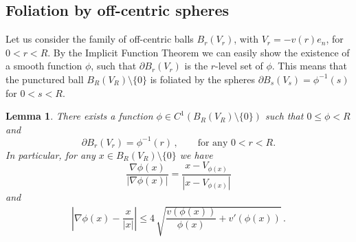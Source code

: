 \documentclass[a4paper,reqno,11pt]{amsart}
\newtheorem{lemma}[theorem]{Lemma}
\newcommand{\de}{\partial}
\renewcommand{\Subset}{\subset\!\subset}
\begin{document}
\subsection{Foliation by off-centric spheres}
Let us consider the family of off-centric balls $B_r(V_r)$, with $V_r = - v(r) e_n$, for $0<r<R$. %
By the Implicit Function Theorem we can easily show the existence of a smooth function $\phi$, such that $\de B_{r}(V_r)$ is the $r$-level set of $\phi$. This means that the punctured ball $B_R(V_R) \setminus \{ 0 \}$ is foliated by the spheres $\de B_{s}(V_s) = \phi^{-1}(s)$ for $0 < s < R$.
\begin{lemma} \label{lem:coarea}
There exists a function $\phi \in C^{1}(B_{R}(V_R) \setminus \{ 0 \})$ such that $0 \leq \phi < R$ and
\begin{equation*}
\de B_{r}(V_r) = \phi^{-1}(r) \, , \qquad \text{for any $0 < r < R$.} 
\end{equation*}
In particular, for any $x \in B_{R}(V_R) \setminus \{ 0 \}$ we have
\begin{equation} \label{eq:gradphi}
\dfrac{\nabla \phi(x)}{|\nabla \phi(x)|} = \dfrac{x - V_{\phi(x)}}{|x - V_{\phi(x)}|}
\end{equation}
and 
\begin{align}
\left| \nabla \phi (x) - \dfrac{x}{|x|} \right| \leq  4 \, \sqrt{\dfrac{v(\phi(x))}{\phi(x)} + v'(\phi(x))} \, . \label{eq:Dphi-1}
\end{align}
\end{lemma}
\end{document}
